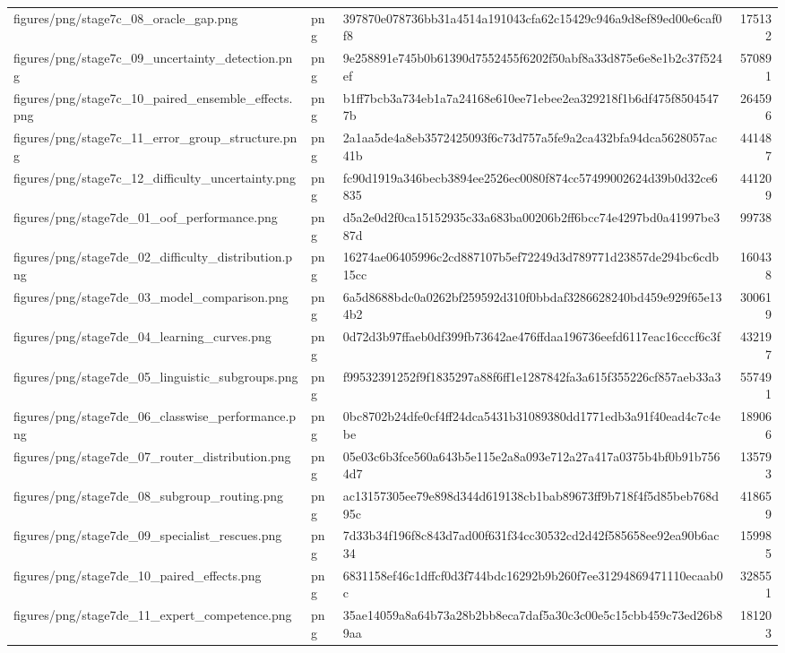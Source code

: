 \begin{tabular}{lllr}
figures/png/stage7c_08_oracle_gap.png & png & 397870e078736bb31a4514a191043cfa62c15429c946a9d8ef89ed00e6caf0f8 & 175132 \\
figures/png/stage7c_09_uncertainty_detection.png & png & 9e258891e745b0b61390d7552455f6202f50abf8a33d875e6e8e1b2c37f524ef & 570891 \\
figures/png/stage7c_10_paired_ensemble_effects.png & png & b1ff7bcb3a734eb1a7a24168e610ee71ebee2ea329218f1b6df475f85045477b & 264596 \\
figures/png/stage7c_11_error_group_structure.png & png & 2a1aa5de4a8eb3572425093f6c73d757a5fe9a2ca432bfa94dca5628057ac41b & 441487 \\
figures/png/stage7c_12_difficulty_uncertainty.png & png & fc90d1919a346becb3894ee2526ec0080f874cc57499002624d39b0d32ce6835 & 441209 \\
figures/png/stage7de_01_oof_performance.png & png & d5a2e0d2f0ca15152935c33a683ba00206b2ff6bcc74e4297bd0a41997be387d & 99738 \\
figures/png/stage7de_02_difficulty_distribution.png & png & 16274ae06405996c2cd887107b5ef72249d3d789771d23857de294bc6cdb15cc & 160438 \\
figures/png/stage7de_03_model_comparison.png & png & 6a5d8688bdc0a0262bf259592d310f0bbdaf3286628240bd459e929f65e134b2 & 300619 \\
figures/png/stage7de_04_learning_curves.png & png & 0d72d3b97ffaeb0df399fb73642ae476ffdaa196736eefd6117eac16cccf6c3f & 432197 \\
figures/png/stage7de_05_linguistic_subgroups.png & png & f99532391252f9f1835297a88f6ff1e1287842fa3a615f355226cf857aeb33a3 & 557491 \\
figures/png/stage7de_06_classwise_performance.png & png & 0bc8702b24dfe0cf4ff24dca5431b31089380dd1771edb3a91f40ead4c7c4ebe & 189066 \\
figures/png/stage7de_07_router_distribution.png & png & 05e03c6b3fce560a643b5e115e2a8a093e712a27a417a0375b4bf0b91b7564d7 & 135793 \\
figures/png/stage7de_08_subgroup_routing.png & png & ac13157305ee79e898d344d619138cb1bab89673ff9b718f4f5d85beb768d95c & 418659 \\
figures/png/stage7de_09_specialist_rescues.png & png & 7d33b34f196f8c843d7ad00f631f34cc30532cd2d42f585658ee92ea90b6ac34 & 159985 \\
figures/png/stage7de_10_paired_effects.png & png & 6831158ef46c1dffcf0d3f744bdc16292b9b260f7ee31294869471110ecaab0c & 328551 \\
figures/png/stage7de_11_expert_competence.png & png & 35ae14059a8a64b73a28b2bb8eca7daf5a30c3c00e5c15cbb459c73ed26b89aa & 181203 \\

\end{tabular}
